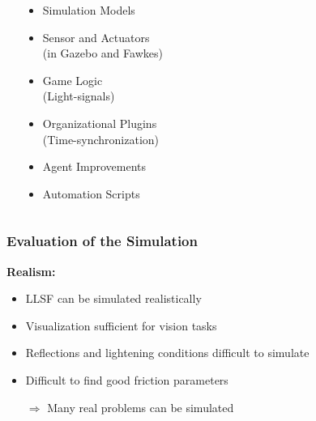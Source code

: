 \documentclass[]{beamer}
\begin{document}
\begin{frame}
\begin{columns}
\begin{overlayarea}{\textwidth}{\textheight}
    \end{overlayarea}
    \begin{overlayarea}{\textwidth}{0.8\textheight}
    \begin{itemize}
    \item Simulation Models
      \pause
    \item Sensor and Actuators\\(in Gazebo and Fawkes)
      \pause
    \item Game Logic\\(Light-signals)
    \item Organizational Plugins\\(Time-synchronization)
      \pause
    \item Agent Improvements
    \item Automation Scripts
    \end{itemize}
    \end{overlayarea}
  \end{columns}
\end{frame}

\begin{frame}
  \frametitle{Evaluation of the Simulation}
  \textbf{\large Realism:}\\
  \begin{itemize}
  \item LLSF can be simulated realistically
  \item Visualization sufficient for vision tasks %
  \item Reflections and lightening conditions difficult to simulate %
  \item Difficult to find good friction parameters
  \item[$\Rightarrow$] Many real problems can be simulated
  \end{itemize}
\end{frame}
\end{document}
